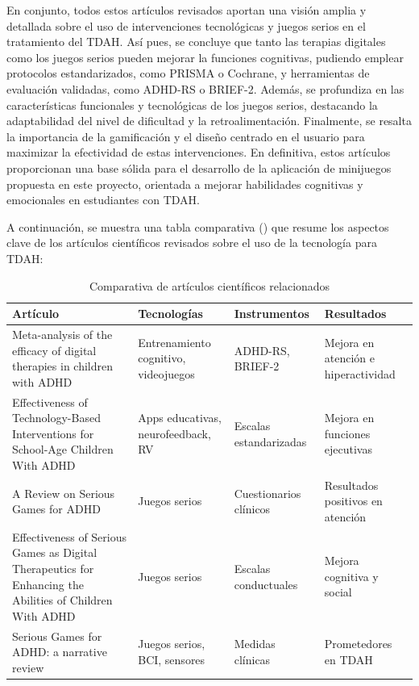 En conjunto, todos estos artículos revisados aportan una visión amplia y detallada sobre el uso de intervenciones tecnológicas y juegos serios en el tratamiento del TDAH.
Así pues, se concluye que tanto las terapias digitales como los juegos serios pueden mejorar la funciones cognitivas, pudiendo emplear protocolos estandarizados, como PRISMA o Cochrane, y herramientas de evaluación validadas, como ADHD-RS o BRIEF-2.
Además, se profundiza en las características funcionales y tecnológicas de los juegos serios, destacando la adaptabilidad del nivel de dificultad y la retroalimentación.
Finalmente, se resalta la importancia de la gamificación y el diseño centrado en el usuario para maximizar la efectividad de estas intervenciones.
En definitiva, estos artículos proporcionan una base sólida para el desarrollo de la aplicación de minijuegos propuesta en este proyecto, orientada a mejorar habilidades cognitivas y emocionales en estudiantes con TDAH.

\newpage
A continuación, se muestra una tabla comparativa () que resume los aspectos clave de los artículos científicos revisados sobre el uso de la tecnología para TDAH:

\begin{table}[H]
\centering
\begin{tabularx}{\textwidth}{|X|X|X|X|}
    \hline
    \textbf{Artículo} & \textbf{Tecnologías} & \textbf{Instrumentos} & \textbf{Resultados} \\
    \hline
    Meta-analysis of the efficacy of digital therapies in children with ADHD &
    Entrenamiento cognitivo, videojuegos &
    ADHD-RS, BRIEF-2 &
    Mejora en atención e hiperactividad \\
    \hline
    Effectiveness of Technology-Based Interventions for School-Age Children With ADHD & 
    Apps educativas, neurofeedback, RV &
    Escalas estandarizadas &
    Mejora en funciones ejecutivas \\
    \hline
    A Review on Serious Games for ADHD &
    Juegos serios &
    Cuestionarios clínicos &
    Resultados positivos en atención \\
    \hline
    Effectiveness of Serious Games as Digital Therapeutics for Enhancing the Abilities of Children With ADHD & 
    Juegos serios &
    Escalas conductuales &
    Mejora cognitiva y social \\
    \hline
    Serious Games for ADHD: a narrative review &
    Juegos serios, BCI, sensores &
    Medidas clínicas &
    Prometedores en TDAH \\
    \hline
\end{tabularx}
\caption{Comparativa de artículos científicos relacionados}
\label{tab:comparativa_articulos}
\end{table}